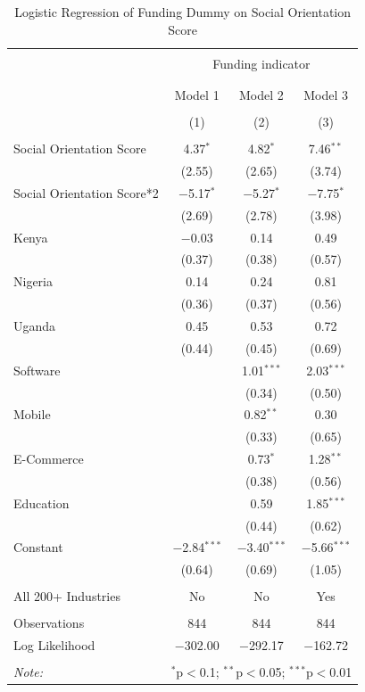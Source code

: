 \documentclass[12pt]{article}
\begin{document}
\begin{table}[!htbp] \centering 
  \caption{Logistic Regression of Funding Dummy on Social Orientation Score} 
  \label{} 
  \scriptsize
\begin{tabular}{@{\extracolsep{5pt}}lccc} 
\\[-1.8ex]\hline 
\hline \\[-1.8ex] 
 & \multicolumn{3}{c}{Funding indicator} \\ 
\cline{2-4} 
\\[-1.8ex] & \multicolumn{3}{c}{} \\ 
 & Model 1 & Model 2 & Model 3 \\ 
\\[-1.8ex] & (1) & (2) & (3)\\ 
\hline \\[-1.8ex] 
Social Orientation Score & 4.37$^{*}$ & 4.82$^{*}$ & 7.46$^{**}$ \\ 
  & (2.55) & (2.65) & (3.74) \\ 
Social Orientation Score*2 & $-$5.17$^{*}$ & $-$5.27$^{*}$ & $-$7.75$^{*}$ \\ 
  & (2.69) & (2.78) & (3.98) \\ 
  Kenya & $-$0.03 & 0.14 & 0.49 \\ 
  & (0.37) & (0.38) & (0.57) \\ 
  Nigeria & 0.14 & 0.24 & 0.81 \\ 
  & (0.36) & (0.37) & (0.56) \\ 
  Uganda & 0.45 & 0.53 & 0.72 \\ 
  & (0.44) & (0.45) & (0.69) \\ 
  Software &  & 1.01$^{***}$ & 2.03$^{***}$ \\ 
  &  & (0.34) & (0.50) \\ 
  Mobile &  & 0.82$^{**}$ & 0.30 \\ 
  &  & (0.33) & (0.65) \\ 
  E-Commerce &  & 0.73$^{*}$ & 1.28$^{**}$ \\ 
  &  & (0.38) & (0.56) \\ 
  Education &  & 0.59 & 1.85$^{***}$ \\ 
  &  & (0.44) & (0.62) \\ 
  Constant & $-$2.84$^{***}$ & $-$3.40$^{***}$ & $-$5.66$^{***}$ \\ 
  & (0.64) & (0.69) & (1.05) \\ 
 \hline \\[-1.8ex] 
  All 200+ Industries & No & No & Yes \\ 
  \hline \\[-1.8ex] 
Observations & 844 & 844 & 844 \\ 
Log Likelihood & $-$302.00 & $-$292.17 & $-$162.72 \\ 
\hline 
\hline \\[-1.8ex] 
\textit{Note:}  & \multicolumn{3}{r}{$^{*}$p$<$0.1; $^{**}$p$<$0.05; $^{***}$p$<$0.01} \\ 
\end{tabular} 
\end{table} 
\end{document}
